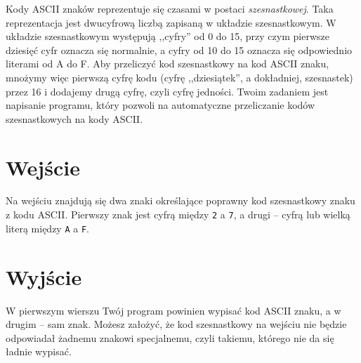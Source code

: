 \documentclass{spiral-kurs}
\begin{document}
\makeheader
%
    Kody ASCII znaków reprezentuje się czasami w postaci \emph{szesnastkowej}.
    Taka reprezentacja jest dwucyfrową liczbą zapisaną w układzie szesnastkowym.
    W układzie szesnastkowym występują ,,cyfry'' od 0 do 15, przy czym pierwsze dziesięć
    cyfr oznacza się normalnie, a cyfry od 10 do 15 oznacza się odpowiednio literami od A do F.
    Aby przeliczyć kod szesnastkowy na kod ASCII znaku, mnożymy więc pierwszą cyfrę kodu
    (cyfrę ,,dziesiątek'', a dokładniej, szesnastek) przez 16 i dodajemy drugą cyfrę, czyli
    cyfrę jedności.
    Twoim zadaniem jest napisanie programu, który pozwoli na automatyczne przeliczanie kodów
    szesnastkowych na kody ASCII.

    \section{Wejście}
    Na wejściu znajdują się dwa znaki określające poprawny kod szesnastkowy
    znaku z kodu ASCII.
    Pierwszy znak jest cyfrą między \texttt{2} a \texttt{7}, a drugi -- cyfrą lub wielką literą
    między \texttt{A} a \texttt{F}.

    \section{Wyjście}
    W pierwszym wierszu Twój program powinien wypisać kod ASCII znaku,
    a w drugim -- sam znak.
    Możesz założyć, że kod szesnastkowy na wejściu nie będzie odpowiadał
    żadnemu znakowi specjalnemu, czyli takiemu, którego nie da się ładnie wypisać.


  
\end{document}
